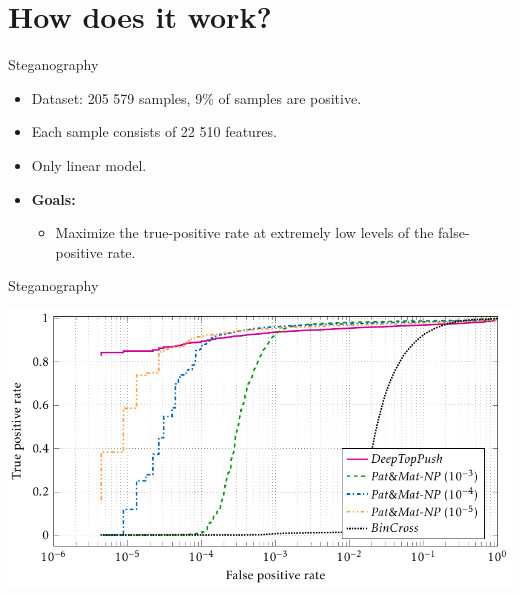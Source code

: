 \documentclass[10pt, aspectratio=169]{beamer}
\begin{document}
\section{How does it work?}

\begin{frame}{Steganography}
  \begin{itemize}
    \item Dataset: 205 579 samples, 9\% of samples are positive.
    \item Each sample consists of 22 510 features.
    \item Only linear model.
    \item \textbf{Goals:}
    \begin{itemize}
      \item Maximize the true-positive rate at extremely low levels of the false-positive rate.
    \end{itemize}
  \end{itemize}
\end{frame}

\begin{frame}{Steganography}
  \begin{center}
    \includegraphics[width=\linewidth, height=0.9\textheight, keepaspectratio]{
      ../images/stego_nsft5.pdf
    }
  \end{center}
\end{frame}
\end{document}
